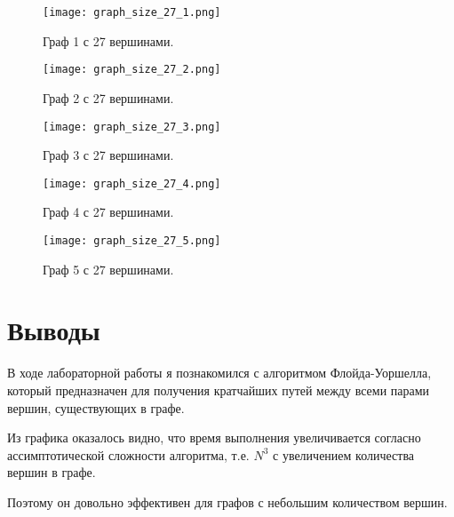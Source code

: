 \documentclass[12pt, a4paper]{report}
\begin{document}
	\begin{figure}[h]
		\centering
		\texttt{[image: graph\_size\_27\_1.png]}
		\caption{Граф 1 с 27 вершинами.}
	\end{figure}
	\begin{figure}[h]
		\centering
		\texttt{[image: graph\_size\_27\_2.png]}
		\caption{Граф 2 с 27 вершинами.}
	\end{figure}
	\begin{figure}[h]
		\centering
		\texttt{[image: graph\_size\_27\_3.png]}
		\caption{Граф 3 с 27 вершинами.}
	\end{figure}
	\begin{figure}[h]
		\centering
		\texttt{[image: graph\_size\_27\_4.png]}
		\caption{Граф 4 с 27 вершинами.}
	\end{figure}
	\begin{figure}[h]
		\centering
		\texttt{[image: graph\_size\_27\_5.png]}
		\caption{Граф 5 с 27 вершинами.}
	\end{figure} 

	\vfill
	\clearpage

	\section*{Выводы}
	В ходе лабораторной работы я познакомился с алгоритмом Флойда-Уоршелла, который предназначен для получения кратчайших путей между всеми парами вершин, существующих в графе. \par
	Из графика оказалось видно, что время выполнения увеличивается согласно ассимптотической сложности алгоритма, т.е. \( N^3 \) с увеличением количества вершин в графе. \par
	Поэтому он довольно эффективен для графов с небольшим количеством вершин.
\end{document}

